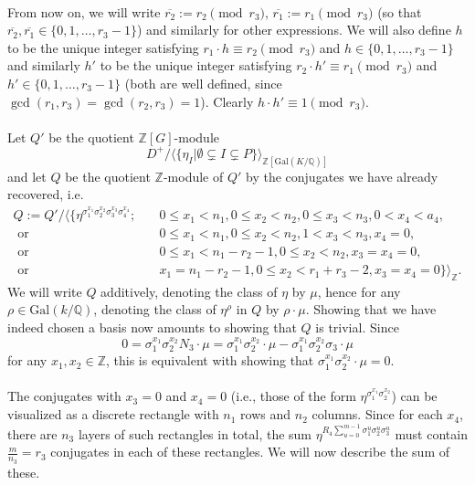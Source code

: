 \documentclass[12pt,a4paper]{article}
\theoremstyle{definition}
\newcommand{\Q}{\mathbb{Q}}
\newcommand{\Z}{\mathbb{Z}}
\newcommand{\Gal}{\mathrm{Gal}}
\newcommand{\uo}{\overline{r_2}}
\newcommand{\vo}{\overline{r_1}}
\begin{document}
\paragraph*{}
From now on, we will write $\uo:=r_2\pmod{r_3}$, $\vo:=r_1\pmod{r_3}$ (so that $\uo,\vo\in\{0,1,\dots,r_3-1\}$) and similarly for other expressions. We will also define $h$ to be the unique integer satisfying $ r_1\cdot h\equiv r_2\pmod{r_3}$ and $h\in\{0,1,\dots,r_3-1\}$ and similarly $h'$ to be the unique integer satisfying $ r_2\cdot h'\equiv r_1\pmod{r_3}$ and $h'\in\{0,1,\dots,r_3-1\}$ (both are well defined, since $\gcd(r_1,r_3)=\gcd(r_2,r_3)=1$). Clearly $h\cdot h'\equiv 1 \pmod{r_3}$.

\paragraph*{}
Let $Q'$ be the quotient $\Z[G]$-module $$D^+/\big\langle \{\eta_I \big\vert \emptyset \subsetneq I \subsetneq P \}\big\rangle_{\Z[\Gal(K/\Q)]}$$
and let $Q$ be the quotient $\Z$-module of $Q'$ by the conjugates we have already recovered, i.e.
\begin{align*}
Q:=Q'/\big\langle \{\eta^{\sigma_1^{x_1}\sigma_2^{x_2}\sigma_3^{x_3}\sigma_4^{x_4}}; \quad & 0\leq x_1< n_1, 0\leq x_2<n_2, 0\leq x_3<n_3,0< x_4<a_4,\\
\text { or }& 0\leq x_1< n_1, 0\leq x_2<n_2, 1< x_3<n_3,x_4=0,\\
\text { or }& 0\leq x_1< n_1-r_2-1, 0\leq x_2<n_2, x_3=x_4=0,\\
\text { or }& x_1= n_1-r_2-1, 0\leq x_2<r_1+r_3-2, x_3=x_4=0 \}\big\rangle_{\Z}.
\end{align*}
We will write $Q$ additively, denoting the class of $\eta$ by $\mu$, hence for any $\rho\in\Gal(k/\Q)$, denoting the class of $\eta^{\rho}$ in $Q$ by $\rho\cdot \mu$.
Showing that we have indeed chosen a basis now amounts to showing that $Q$ is trivial. Since $$0=\sigma_1^{x_1}\sigma_2^{x_2}N_3\cdot \mu=\sigma_1^{x_1}\sigma_2^{x_2}\cdot \mu-\sigma_1^{x_1}\sigma_2^{x_2}\sigma_3\cdot \mu$$
for any $x_1,x_2\in\Z$,
this is equivalent with showing that $\sigma_1^{x_1}\sigma_2^{x_2}\cdot \mu=0$.

\paragraph*{}
The conjugates with $x_3=0$ and $x_4=0$ (i.e., those of the form $\eta^{\sigma_1^{x_1}\sigma_2^{x_2}}$) can be visualized as a discrete rectangle with $n_1$ rows and $n_2$ columns. Since for each $x_4$, there are $n_3$ layers of such rectangles in total, the sum $\eta^{R_4\sum_{u=0}^{m-1}\sigma_1^{u}\sigma_2^{u}\sigma_3^{u}}$ must contain $\frac{m}{n_3}=r_3$ conjugates in each of these rectangles. We will now describe the sum of these. 
\end{document}
